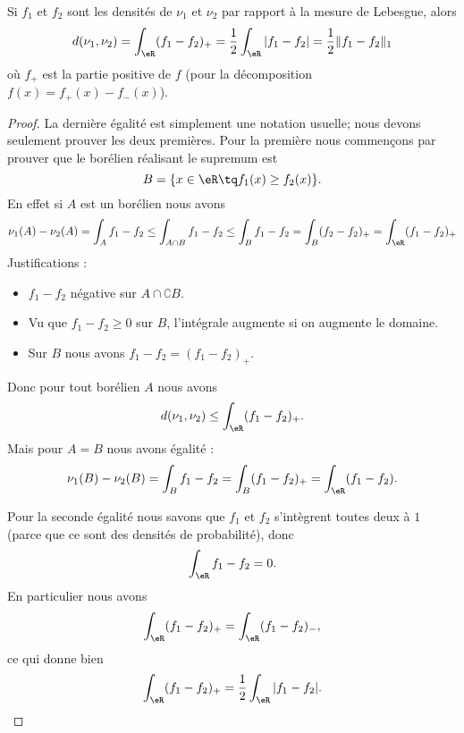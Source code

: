 \begin{theorem}
    Si \( f_1\) et \( f_2\) sont les densités de \( \nu_1\) et \( \nu_2\) par rapport à la mesure de Lebesgue, alors
    \begin{equation}
        d(\nu_1,\nu_2)=\int_{\eR}(f_1-f_2)_+=\frac{ 1 }{2}\int_{\eR}| f_1-f_2 |=\frac{ 1 }{2}\| f_1-f_2 \|_1
    \end{equation}
    où \( f_+\) est la partie positive de \( f\) (pour la décomposition \( f(x)=f_+(x)-f_-(x)\)).
\end{theorem}

\begin{proof}
    La dernière égalité est simplement une notation usuelle; nous devons seulement prouver les deux premières. Pour la première nous commençons par prouver que le borélien réalisant le supremum est
    \begin{equation}
        B=\{ x\in\eR\tq f_1(x)\geq f_2(x) \}.
    \end{equation}
    En effet si \( A\) est un borélien nous avons
    \begin{equation}
        \nu_1(A)-\nu_2(A)=\int_Af_1-f_2
        \leq\int_{A\cap B}f_1-f_2
        \leq\int_Bf_1-f_2
        =\int_B(f_2-f_2)_+
        =\int_{\eR}(f_1-f_2)_+
    \end{equation}
    Justifications :
    \begin{itemize}
        \item  \( f_1-f_2\) négative sur \( A\cap \complement B\).
        \item Vu que \( f_1-f_2\geq0\) sur \( B\), l'intégrale augmente si on augmente le domaine.
        \item Sur \( B\) nous avons \( f_1-f_2=(f_1-f_2)_+\).
    \end{itemize}
    Donc pour tout borélien \( A\) nous avons
    \begin{equation}
        d(\nu_1,\nu_2)\leq \int_{\eR}(f_1-f_2)_+.
    \end{equation}
    Mais pour \( A=B\) nous avons égalité :
    \begin{equation}
        \nu_1(B)-\nu_2(B)=\int_{B}f_1-f_2=\int_B(f_1-f_2)_+=\int_{\eR}(f_1-f_2).
    \end{equation}

    Pour la seconde égalité nous savons que \( f_1\) et \( f_2\) s'intègrent toutes deux à \( 1\) (parce que ce sont des densités de probabilité), donc
    \begin{equation}
        \int_{\eR}f_1-f_2=0.
    \end{equation}
    En particulier nous avons
    \begin{equation}
        \int_{\eR}(f_1-f_2)_+=\int_{\eR}(f_1-f_2)_-,
    \end{equation}
    ce qui donne bien
    \begin{equation}
        \int_{\eR}(f_1-f_2)_+=\frac{ 1 }{2}\int_{\eR}|f_1-f_2|.
    \end{equation}
\end{proof}

